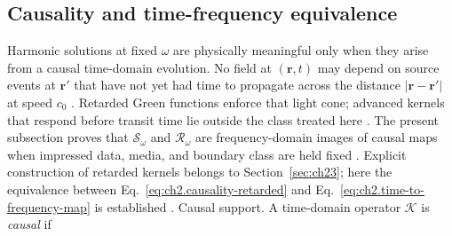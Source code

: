 \subsection{Causality and time-frequency equivalence}
\label{sec:ch223}

Harmonic solutions at fixed $\omega$ are physically meaningful only when they arise from a
causal time-domain evolution. No field at $(\mathbf{r},t)$ may depend on source events at
$\mathbf{r}'$ that have not yet had time to propagate across the distance
$|\mathbf{r}-\mathbf{r}'|$ at speed $c_0$ \cite{maxwell1873,sommerfeld1949}. Retarded Green
functions enforce that light cone; advanced kernels that respond before transit time lie
outside the class treated here \cite{stratton1941}. The present subsection proves that
$\mathcal{S}_\omega$ and $\mathcal{R}_\omega$ are frequency-domain images of causal maps when
impressed data, media, and boundary class are held fixed \cite{stratton1941}. Explicit
construction of retarded kernels belongs to Section~\ref{sec:ch23}; here the equivalence
between Eq.~\eqref{eq:ch2.causality-retarded} and Eq.~\eqref{eq:ch2.time-to-frequency-map}
is established \cite{harrington2001}.
Causal support. A time-domain operator \(\mathcal{K}\) is \emph{causal} if

